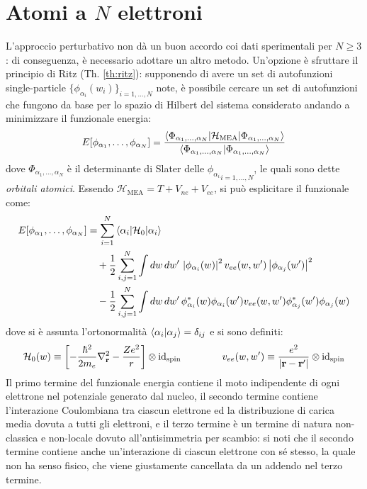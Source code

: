 
\section{Atomi a \texorpdfstring{$ N $}{N} elettroni}

L'approccio perturbativo non dà un buon accordo coi dati sperimentali per $ N \ge 3 $: di conseguenza, è necessario adottare un altro metodo. Un'opzione è sfruttare il principio di Ritz (Th. \ref{th:ritz}): supponendo di avere un set di autofunzioni single-particle $ \{\phi_{\alpha_i}(w_i)\}_{i = 1, \dots, N} $ note, è possibile cercare un set di autofunzioni che fungono da base per lo spazio di Hilbert del sistema considerato andando a minimizzare il funzionale energia:
\begin{equation}
	E[\phi_{\alpha_1}, \dots, \phi_{\alpha_N}] = \frac{\braket{\Phi_{\alpha_1, \dots, \alpha_N} | \mathcal{H}_\text{MEA} | \Phi_{\alpha_1, \dots, \alpha_N}}}{\braket{\Phi_{\alpha_1, \dots, \alpha_N} | \Phi_{\alpha_1, \dots, \alpha_N}}}
	\label{eq:en-functional-def}
\end{equation}
dove $ \Phi_{\alpha_1, \dots, \alpha_N} $ è il determinante di Slater delle $ {\phi_{\alpha_i}}_{i = 1, \dots, N} $, le quali sono dette \textit{orbitali atomici}. Essendo $ \mathcal{H}_\text{MEA} = T + V_{ne} + V_{ee} $, si può esplicitare il funzionale come:
\begin{equation}
	\begin{split}
		E[\phi_{\alpha_1}, \dots, \phi_{\alpha_N}]
		& = \sum_{i = 1}^{N} \braket{\alpha_i | \mathcal{H}_0 | \alpha_i} \\
		& \quad + \frac{1}{2} \sum_{i,j = 1}^{N} \int dw\,dw'\, \left\lvert\phi_{\alpha_i}(w)\right\rvert^2 v_{ee}(w,w') \left\lvert\phi_{\alpha_j}(w')\right\rvert^2 \\
		& \quad - \frac{1}{2} \sum_{i,j = 1}^{N} \int dw\,dw'\, \phi_{\alpha_i}^*(w) \phi_{\alpha_i}(w') v_{ee}(w,w') \phi_{\alpha_j}^*(w') \phi_{\alpha_j}(w)
	\end{split}
	\label{eq:en-functional}
\end{equation}
dove si è assunta l'ortonormalità $ \braket{\alpha_i | \alpha_j} = \delta_{ij} $ e si sono definiti:
\begin{equation}
	\mathcal{H}_0(w) \equiv \left[ -\frac{\hbar^2}{2m_e} \nabla^2_{\mathbf{r}} - \frac{Ze^2}{r} \right] \otimes \operatorname{id}_\text{spin}
	\qquad \qquad
	v_{ee}(w,w') \equiv \frac{e^2}{\left\lvert\mathbf{r} - \mathbf{r}'\right\rvert} \otimes \operatorname{id}_\text{spin}
\end{equation}
Il primo termine del funzionale energia contiene il moto indipendente di ogni elettrone nel potenziale generato dal nucleo, il secondo termine contiene l'interazione Coulombiana tra ciascun elettrone ed la distribuzione di carica media dovuta a tutti gli elettroni, e il terzo termine è un termine di natura non-classica e non-locale dovuto all'antisimmetria per scambio: si noti che il secondo termine contiene anche un'interazione di ciascun elettrone con sé stesso, la quale non ha senso fisico, che viene giustamente cancellata da un addendo nel terzo termine.

